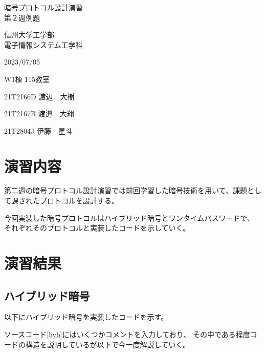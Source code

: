 \documentclass[a4paper,11pt,titlepage,dvipdfmx]{jsarticle}
\begin{document}
\begin{titlepage}
\noindent
\vspace{6cm}
\begin{center}
\begin{LARGE}
暗号プロトコル設計演習 \\
第２週例題
\end{LARGE}
\end{center}
\vspace{6cm}
\begin{flushright}
信州大学工学部 \\
電子情報システム工学科 \\
\begin{description}
\setlength{\leftskip}{8.9cm}
\item[　　実験日:] 2023/07/05
\item[　実験場所:] W1棟 115教室
\item[　　実験者:] 21T2166D 渡辺　大樹
\item[共同実験者:] 21T2167B 渡邉　大翔
\item[　　　　　 ] 21T2804J 伊藤　星斗
\end{description}
\end{flushright}
\end{titlepage}

\section{演習内容}
第二週の暗号プロトコル設計演習では前回学習した暗号技術を用いて、課題として課されたプロトコルを設計する。

今回実装した暗号プロトコルはハイブリッド暗号とワンタイムパスワードで、
それぞれそのプロトコルと実装したコードを示していく。

\section{演習結果}
\subsection{ハイブリッド暗号}
以下にハイブリッド暗号を実装したコードを示す。


ソースコード\ref{hyb}にはいくつかコメントを入力しており、
その中である程度コードの構造を説明しているが以下で今一度解説していく。
\end{document}
